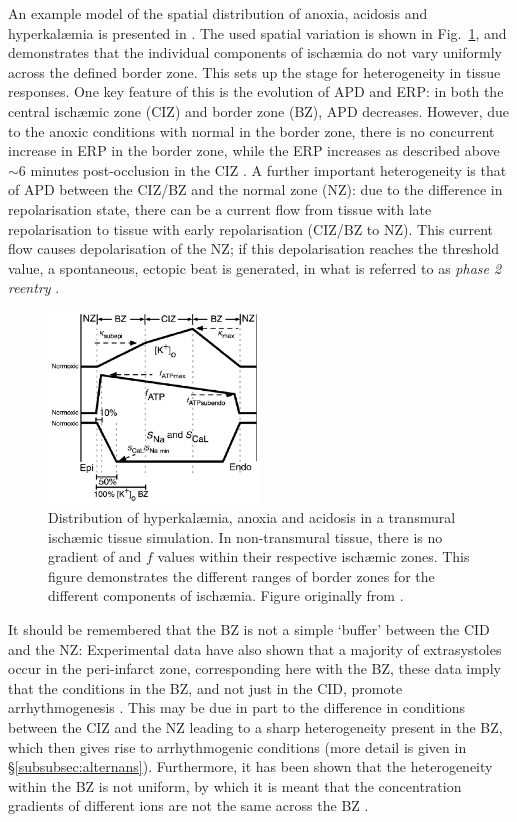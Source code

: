 \documentclass[../thesis-main.tex]{subfiles}
\begin{document}
 An example model of the spatial distribution of anoxia, acidosis and hyperkal\ae{}mia is presented in \citet{Tice2007}. The used spatial variation is shown in Fig.~\ref{fig:spatial-ischaemia}, and demonstrates that the individual components of isch\ae{}mia do not vary uniformly across the defined border zone. This sets up the stage for heterogeneity in tissue responses. One key feature of this is the evolution of APD and ERP: in both the central isch\ae{}mic zone (CIZ) and border zone (BZ), APD decreases. However, due to the anoxic conditions with normal \ko{} in the border zone, there is no concurrent increase in ERP in the border zone, while the ERP increases as described above $\sim6$ minutes post-occlusion in the CIZ \citep{Tice2007, Coronel2012}. A further important heterogeneity is that of APD between the CIZ/BZ and the normal zone (NZ): due to the difference in repolarisation state, there can be a current flow from tissue with late repolarisation to tissue with early repolarisation (CIZ/BZ to NZ). This current flow causes depolarisation of the NZ; if this depolarisation reaches the threshold value, a spontaneous, ectopic beat is generated, in what is referred to as \emph{phase 2 reentry} \citep{Coronel2009, Lukas1996, Coronel2012}.
 \begin{figure}
  \centering
  \includegraphics[width=0.5\textwidth]{spatial-ischaemia}
  \caption[Distribution of isch\ae{}mic properties in tissue.]{Distribution of hyperkal\ae{}mia, anoxia and acidosis in a transmural isch\ae{}mic tissue simulation. In non-transmural tissue, there is no gradient of \ko{} and $f$ values within their respective isch\ae{}mic zones. This figure demonstrates the different ranges of border zones for the different components of isch\ae{}mia. Figure originally from \citet{Tice2007}.}
  \label{fig:spatial-ischaemia}
 \end{figure}
 
 It should be remembered that the BZ is not a simple `buffer' between the CID and the NZ: Experimental data have also shown that a majority of extrasystoles occur in the peri-infarct zone, corresponding here with the BZ, \idest{} these data imply that the conditions in the BZ, and not just in the CID, promote arrhythmogenesis \citep{Chou2007}. This may be due in part to the difference in conditions between the CIZ and the NZ leading to a sharp heterogeneity present in the BZ, which then gives rise to arrhythmogenic conditions (more detail is given in \S\ref{subsubsec:alternans}). Furthermore, it has been shown that the heterogeneity within the BZ is not uniform, by which it is meant that the concentration gradients of different ions are not the same across the BZ \citep{Niederer2013}.
 
\end{document}
